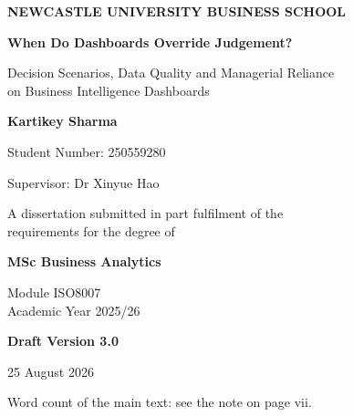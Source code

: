 \documentclass[12pt,a4paper]{article}
\begin{document}

\thispagestyle{plain}
\begin{center}
\vspace*{18pt}

{\large\bfseries NEWCASTLE UNIVERSITY BUSINESS SCHOOL}

\vspace{50pt}

{\LARGE\bfseries When Do Dashboards Override Judgement?}

\vspace{14pt}

{\large Decision Scenarios, Data Quality and Managerial Reliance\\[6pt]
on Business Intelligence Dashboards}

\vspace{60pt}

{\large\bfseries Kartikey Sharma}

\vspace{8pt}

{\large Student Number: 250559280}

\vspace{50pt}

{\large Supervisor: Dr Xinyue Hao}

\vspace{50pt}

{\large A dissertation submitted in part fulfilment of the\\[6pt]
requirements for the degree of}

\vspace{10pt}

{\large\bfseries MSc Business Analytics}

\vspace{40pt}

{\large Module ISO8007\\[6pt]
Academic Year 2025/26}

\vspace{30pt}

{\large\bfseries Draft Version 3.0}

\vspace{6pt}

{\large 25 August 2026}

\vspace{20pt}

{\small Word count of the main text: see the note on page vii.}

\end{center}
\end{document}
